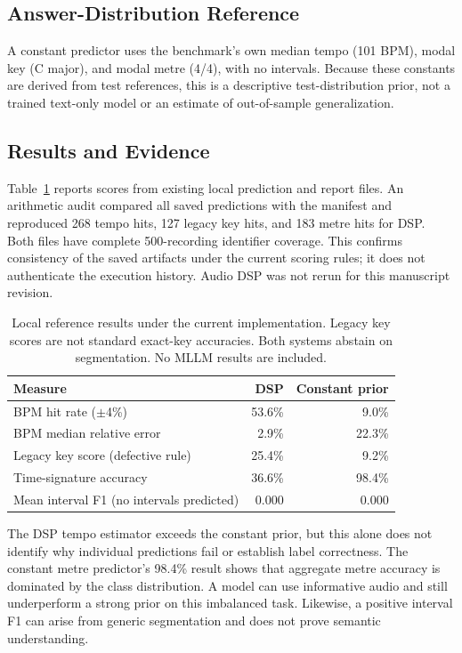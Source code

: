 \documentclass[11pt,a4paper]{article}
\begin{document}
\subsection{Answer-Distribution Reference}
A constant predictor uses the benchmark's own median tempo (101 BPM), modal key (C major), and modal metre (4/4), with no intervals. Because these constants are derived from test references, this is a descriptive test-distribution prior, not a trained text-only model or an estimate of out-of-sample generalization.

\subsection{Results and Evidence}
Table~\ref{tab:baseline-results} reports scores from existing local prediction and report files. An arithmetic audit compared all saved predictions with the manifest and reproduced 268 tempo hits, 127 legacy key hits, and 183 metre hits for DSP. Both files have complete 500-recording identifier coverage. This confirms consistency of the saved artifacts under the current scoring rules; it does not authenticate the execution history. Audio DSP was not rerun for this manuscript revision.

\begin{table}[tbp]
\centering\small
\begin{tabularx}{\linewidth}{@{}Xrr@{}}
\toprule
Measure & DSP & Constant prior \\
\midrule
BPM hit rate ($\pm$4\%) & 53.6\% & 9.0\% \\
BPM median relative error & 2.9\% & 22.3\% \\
Legacy key score (defective rule) & 25.4\% & 9.2\% \\
Time-signature accuracy & 36.6\% & 98.4\% \\
Mean interval F1 (no intervals predicted) & 0.000 & 0.000 \\
\bottomrule
\end{tabularx}
\caption{Local reference results under the current implementation. Legacy key scores are not standard exact-key accuracies. Both systems abstain on segmentation. No MLLM results are included.}
\label{tab:baseline-results}
\end{table}

The DSP tempo estimator exceeds the constant prior, but this alone does not identify why individual predictions fail or establish label correctness. The constant metre predictor's 98.4\% result shows that aggregate metre accuracy is dominated by the class distribution. A model can use informative audio and still underperform a strong prior on this imbalanced task. Likewise, a positive interval F1 can arise from generic segmentation and does not prove semantic understanding.
\end{document}
